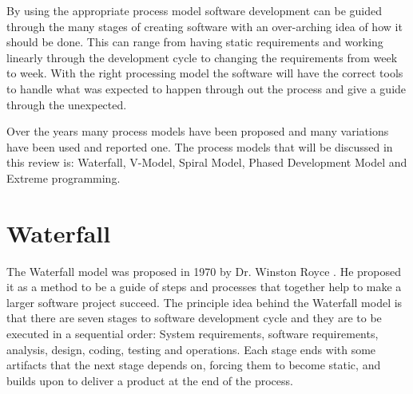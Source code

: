 \documentclass{style/CRPITStyle}
\renewcommand{\cite}{\citep}
\begin{document}
By using the appropriate process model software development can be guided
through the many stages of creating software with an over-arching idea of how it
should be done. This can range from having static requirements and working
linearly through the development cycle to changing the requirements from week to
week. With the right processing model the software will have the correct tools
to handle what was expected to happen through out the process and give a guide
through the unexpected.


\vspace{.1in}

Over the years many process models have been proposed and many variations have
been used and reported one. The process models that will be discussed in this
review is: Waterfall, V-Model, Spiral Model, Phased Development Model and
Extreme programming.

\section{Waterfall} %

The Waterfall model was proposed in 1970 by Dr. Winston Royce \cite{Waterfall:1970}.
He proposed it as a method to be a guide of steps and processes that together
help to make a larger software project succeed. 
The principle idea behind the Waterfall model is that there are seven stages to
software development cycle and they are to be executed in a sequential order:
System requirements, software requirements, analysis, design, coding, testing and operations.
Each stage ends with some artifacts that the next stage depends on, forcing them
to become static, and builds upon to deliver a product at the end of the process.
\end{document}
